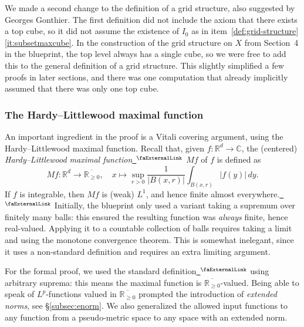 \documentclass[12pt, reqno]{amsart}
\newcommand*{\complex}{\mathbb{C}} %
\newcommand*{\real}{\mathbb{R}} %
\newcommand{\ennreal}{\overline{\real_{\ge0}}}
\newcommand{\extlink}{~\ensuremath{{}^\text{\faExternalLink}}}
\theoremstyle{definition}
\theoremstyle{plain}
\begin{document}
We made a second change to the definition of a grid structure, also suggested by Georges Gonthier.
The first definition did not include the axiom that there exists a top cube,
so it did not assume the existence of $I_0$ as in item~\ref{def:grid-structure}\ref{it:subsetmaxcube}.
In the construction of the grid structure on $X$
from Section~4 in the blueprint,
the top level always has a single cube,
so we were free to add this to the general definition of a grid structure.
This slightly simplified a few proofs in later sections,
and there was one computation that already implicitly assumed
that there was only one top cube.

\subsubsection{The Hardy--Littlewood maximal function} An important ingredient in the proof is a Vitali covering argument, using the Hardy--Littlewood maximal function.
Recall that, given $f\colon\real^d\to\complex$, the (centered) \emph{Hardy–Littlewood maximal function}\href{https://github.com/fpvandoorn/carleson/blob/AFM-frozen/Carleson/ToMathlib/HardyLittlewood.lean#L31-L32}{\extlink} $M f$ of $f$ is defined as
\begin{equation*}
Mf\colon\real^d \to\ennreal, \quad x\mapsto \sup_{r>0}\frac{1}{|B(x,r)|}\int_{B(x,r)}|f(y)|\,dy.
\end{equation*}
If $f$ is integrable, then $M f$ is (weak) $L^1$, and hence finite almost everywhere.\href{https://github.com/fpvandoorn/carleson/blob/AFM-frozen/Carleson/ToMathlib/HardyLittlewood.lean#L365-L369}{\extlink} Initially, the blueprint only used a variant taking a supremum over finitely many balls: this ensured the resulting function was \emph{always} finite, hence real-valued. Applying it to a countable collection of balls requires taking a limit and using the monotone convergence theorem.
This is somewhat inelegant, since it uses a non-standard definition and requires an extra limiting argument.

For the formal proof, we used the standard definition\href{https://github.com/fpvandoorn/carleson/blob/AFM-frozen/Carleson/ToMathlib/HardyLittlewood.lean#L31-L32}{\extlink}
using arbitrary suprema: this means the maximal function is $\ennreal$-valued.
Being able to speak of $L^p$-functions valued in $\ennreal$ prompted the introduction of \emph{extended norms}, see \S\ref{subsec:enorm}.
We also generalized the allowed input functions to any function from a pseudo-metric space to any space with an extended norm.
\end{document}

